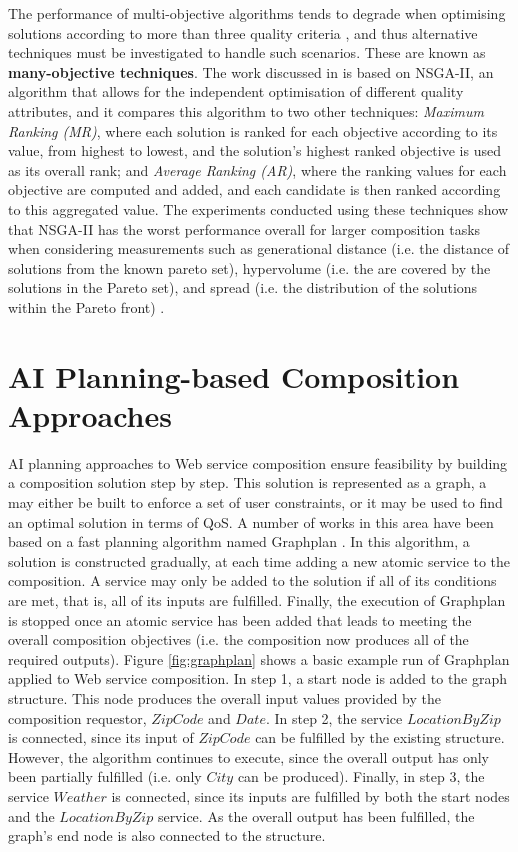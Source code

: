 The performance of multi-objective algorithms tends to degrade when optimising solutions according to more than three quality criteria \cite{de2010many}, and thus alternative techniques must be investigated to handle such scenarios. These are known as \textbf{many-objective techniques}. The work discussed in \cite{de2010many} is based on NSGA-II, an algorithm that allows for the independent optimisation of different quality attributes, and it compares this algorithm to two other techniques: \textit{Maximum Ranking (MR)}, where each solution is ranked for each objective according to its value, from highest to lowest, and the solution's highest ranked objective is used as its overall rank; and \textit{Average Ranking (AR)}, where the ranking values for each objective are computed and added, and each candidate is then ranked according to this aggregated value. The experiments conducted using these techniques show that NSGA-II has the worst performance overall for larger composition tasks when considering measurements such as generational distance (i.e. the distance of solutions from the known pareto set), hypervolume (i.e. the are covered by the solutions in the Pareto set), and spread (i.e. the distribution of the solutions within the Pareto front) \cite{bader2010hypervolume,joshi2015improving}.

\section{AI Planning-based Composition Approaches}

AI planning approaches to Web service composition ensure feasibility by building a composition solution step by step. This solution is represented as a graph, a may either be built to enforce a set of user constraints, or it may be used to find an optimal solution in terms of QoS. A number of works in this area \cite{feng2013dynamic,wang2013genetic,xia2013web,wang2014automated} have been based on a fast planning algorithm named Graphplan \cite{blum1997fast}. In this algorithm, a solution is constructed gradually, at each time adding a new atomic service to the composition. A service may only be added to the solution if all of its conditions are met, that is, all of its inputs are fulfilled. Finally, the execution of Graphplan is stopped once an atomic service has been added that leads to meeting the overall composition objectives (i.e. the composition now produces all of the required outputs). Figure \ref{fig:graphplan} shows a basic example run of Graphplan applied to Web service composition. In step 1, a start node is added to the graph structure. This node produces the overall input values provided by the composition requestor, $ZipCode$ and $Date$. In step 2, the service $LocationByZip$ is connected, since its input of $ZipCode$ can be fulfilled by the existing structure. However, the algorithm continues to execute, since the overall output has only been partially fulfilled (i.e. only $City$ can be produced). Finally, in step 3, the service $Weather$ is connected, since its inputs are fulfilled by both the start nodes and the $LocationByZip$ service. As the overall output has been fulfilled, the graph's end node is also connected to the structure.

